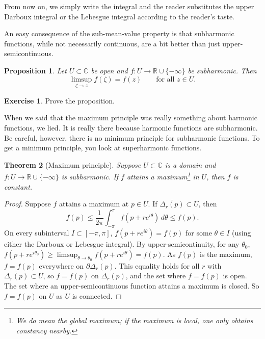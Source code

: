 \documentclass[12pt,openany]{book}
\newcommand{\C}{{\mathbb{C}}}
\newcommand{\R}{{\mathbb{R}}}
\theoremstyle{plain}
\newtheorem{thm}{Theorem}[section]
\newtheorem{prop}[thm]{Proposition}
\theoremstyle{remark}
\theoremstyle{definition}
\newenvironment{exbox}{%
    \def\FrameCommand{\vrule width 1pt \relax\hspace{10pt}}%
    \MakeFramed{\advance\hsize-\width\FrameRestore}%
}{%
    \endMakeFramed
}
\theoremstyle{exercise}
\newtheorem{exercise}{Exercise}[section]
\theoremstyle{example}
\begin{document}
From now on, we simply write the integral and
the reader substitutes the upper Darboux integral or the Lebesgue integral
according to the reader's taste.

An easy consequence of the sub-mean-value property is that subharmonic
functions, while not necessarily continuous, are a bit better than just
upper-semicontinuous.

\begin{prop}
Let $U \subset \C$ be open and
$f \colon U \to \R \cup\{- \infty \}$ be subharmonic.
Then 
\begin{equation*}
\limsup_{\zeta \to z} f(\zeta) = f(z) 
\qquad \text{for all $z \in U$.}
\end{equation*}
\end{prop}

\begin{exbox}
\begin{exercise}
Prove the proposition.
\end{exercise}
\end{exbox}

When we said that the maximum principle was really something about harmonic
functions, we lied.  It is really there because harmonic functions are
subharmonic.  Be careful, however, there is no minimum principle for
subharmonic functions.  To get a minimum principle, you look at superharmonic
functions.

\begin{thm}[Maximum principle]
Suppose $U \subset \C$ is a domain and $f \colon U \to \R \cup \{ -\infty \}$
is subharmonic.  If $f$ attains a maximum\footnote{%
We do mean the global maximum; if the maximum is local, one only
obtains constancy nearby.}
in $U$, then $f$ is constant.
\end{thm}

\begin{proof}
Suppose $f$ attains a maximum at $p \in U$.
If
$\overline{\Delta_r(p)} \subset U$, then
\begin{equation*}
f(p) \leq \frac{1}{2\pi} \int_{-\pi}^{\pi} f(p+re^{i\theta})\, d\theta \leq f(p)
.
\end{equation*}
On every subinterval $I \subset [-\pi,\pi]$, $f(p+re^{i\theta}) = f(p)$
for some $\theta \in I$ (using either the Darboux or Lebesgue integral).
By upper-semicontinuity, for any $\theta_0$,
$f(p+re^{i\theta_0}) \geq
\limsup_{\theta \to \theta_0} f(p+re^{i\theta}) = f(p)$.
As $f(p)$ is the maximum,
$f = f(p)$ everywhere on $\partial \Delta_r(p)$.
This equality holds for all $r$
with $\overline{\Delta_r(p)} \subset U$, so $f=f(p)$ on $\Delta_r(p)$,
and the set where $f=f(p)$ is open.  The set where an upper-semicontinuous
function attains a maximum is closed.  So $f=f(p)$ on $U$ as $U$ is
connected.
\end{proof}
\end{document}
